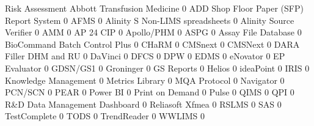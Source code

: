 \documentclass{article}
\begin{document}
\begin{Schunk}
\begin{Soutput}
                                           Risk Assessment
  Abbott Transfusion Medicine                            0
  ADD Shop Floor Paper (SFP) Report System               0
  AFMS                                                   0
  Alinity S Non-LIMS spreadsheets                        0
  Alinity Source Verifier                                0
  AMM                                                    0
  AP 24 CIP                                              0
  Apollo/PHM                                             0
  ASPG                                                   0
  Assay File Database                                    0
  BioCommand Batch Control Plus                          0
  CHaRM                                                  0
  CMSnext                                                0
  CMSNext                                                0
  DARA Filler DHM and RU                                 0
  DaVinci                                                0
  DFCS                                                   0
  DPW                                                    0
  EDMS                                                   0
  eNovator                                               0
  EP Evaluator                                           0
  GDSN/GS1                                               0
  Groninger                                              0
  GS Reports                                             0
  Helios                                                 0
  ideaPoint                                              0
  IRIS                                                   0
  Knowledge Management                                   0
  Metrics Library                                        0
  MQA Protocol                                           0
  Navigator                                              0
  PCN/SCN                                                0
  PEAR                                                   0
  Power BI                                               0
  Print on Demand                                        0
  Pulse                                                  0
  QIMS                                                   0
  QPI                                                    0
  R&D Data Management Dashboard                          0
  Reliasoft Xfmea                                        0
  RSLMS                                                  0
  SAS                                                    0
  TestComplete                                           0
  TODS                                                   0
  TrendReader                                            0
  WWLIMS                                                 0
                                          

\end{Soutput}
\end{Schunk}
\end{document}
